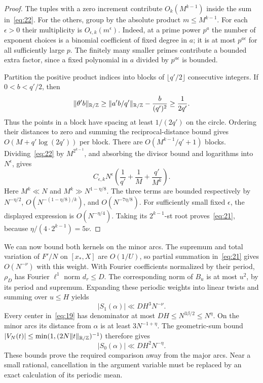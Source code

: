 \begin{proof}
The tuples with a zero increment contribute $O_k(M^{k-1})$ inside
the sum in~\eqref{eq:22}. For the others, group by the absolute product
$m\le M^{k-1}$. For each $\epsilon>0$ their multiplicity is
$O_{\epsilon,k}(m^\epsilon)$. Indeed, at a prime power $p^a$ the
number of exponent choices is a binomial coefficient of fixed degree
in $a$; it is at most $p^{a\epsilon}$ for all sufficiently large $p$.
The finitely many smaller primes contribute a bounded extra factor,
since a fixed polynomial in $a$ divided by $p^{a\epsilon}$ is bounded.

Partition the positive product indices into blocks of
$\lfloor q'/2\rfloor$ consecutive integers. If $0<b<q'/2$, then
\[
 \|\theta'b\|_{\mathbb R/\mathbb Z}
 \ge\|a'b/q'\|_{\mathbb R/\mathbb Z}-\frac b{(q')^2}
 \ge\frac1{2q'}.
\]
Thus the points in a block have spacing at least $1/(2q')$ on the
circle. Ordering their distances to zero and summing the reciprocal-distance
bound gives $O(M+q'\log(2q'))$ per block. There are
$O(M^{k-1}/q'+1)$ blocks. Dividing~\eqref{eq:22} by
$M^{2^{k-1}}$, and absorbing the divisor bound and logarithms into
$N^\epsilon$, gives
\[
 C_{\epsilon,k}N^\epsilon
       \left(\frac1{q'}+\frac1M+\frac{q'}{M^k}\right).
\]
Here $M^k\ll N$ and $M^k\gg N^{1-\eta/8}$. The three terms are
bounded respectively by $N^{-\eta/2}$,
$O(N^{-(1-\eta/8)/k})$, and $O(N^{-7\eta/8})$.
For sufficiently small fixed $\epsilon$, the displayed expression
is $O(N^{-\eta/4})$. Taking its $2^{k-1}$-st root proves~\eqref{eq:21},
because $\eta/(4\cdot2^{k-1})=5\nu$.
\end{proof}

We can now bound both kernels on the minor arcs. The supremum and
total variation of $F'/N$ on $[x_*,X]$ are $O(1/U)$, so partial
summation in~\eqref{eq:21} gives $O(N^{-\nu})$ with this weight.
With Fourier coefficients normalized by their period, $\rho_D$ has
Fourier $\ell^1$ norm $d_r\le D$. The corresponding norm of $B_u$
is at most $u^2$, by its period and supremum. Expanding these periodic
weights into linear twists and summing over $u\le H$ yields
\[
 |S_1(\alpha)|\ll DH^3N^{-\nu}.
\]
Every center in~\eqref{eq:19} has denominator at most
$DH\le N^{3\beta/2}\le N^\eta$. On the minor arcs its distance
from $\alpha$ is at least $3N^{-1+\eta}$. The geometric-sum bound
$|V_N(t)|\le\min(1,(2N\|t\|_{\mathbb R/\mathbb Z})^{-1})$ therefore gives
\[
 |S_0(\alpha)|\ll DH^2N^{-\eta}.
\]
These bounds prove the required comparison away from the major arcs.
Near a small rational, cancellation in the argument variable must be
replaced by an exact calculation of its periodic mean.

